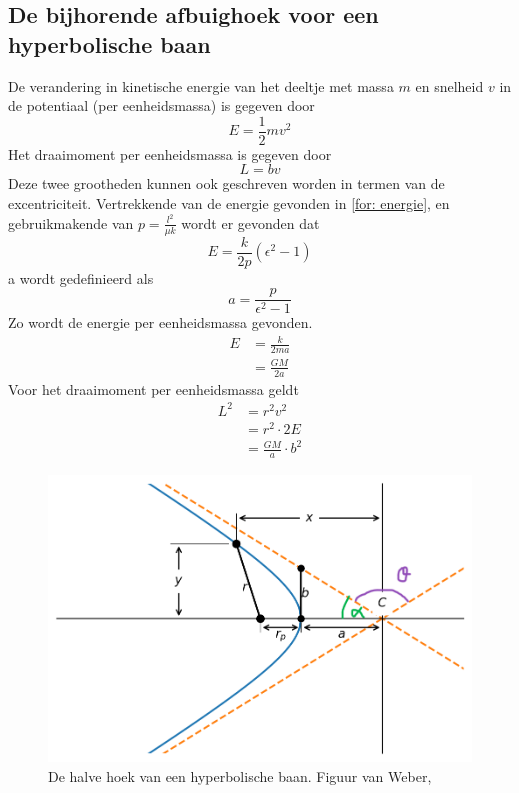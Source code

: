 \subsection{De bijhorende afbuighoek voor een hyperbolische baan}
De verandering in kinetische energie van het deeltje met massa $m$ en snelheid $v$ in de potentiaal (per eenheidsmassa) is gegeven door 
\begin{equation}
    E=\frac{1}{2}mv^{2}
    \label{for:energie}
\end{equation}
Het draaimoment per eenheidsmassa is gegeven door
\begin{equation}
    L=bv
    \label{for:draaimoment}
\end{equation}
Deze twee grootheden kunnen ook geschreven worden in termen van de excentriciteit. Vertrekkende van de energie gevonden in \cref{for: energie}, en gebruikmakende van $p=\frac{l^{2}}{\mu k}$ wordt er gevonden dat
$$E=\frac{k}{2p}(\epsilon^{2}-1)$$
a wordt gedefinieerd als 
$$a=\frac{p}{\epsilon^{2}-1}$$
Zo wordt de energie per eenheidsmassa gevonden.
\begin{align}
    E &= \frac{k}{2ma}\nonumber \\
    &= \frac{GM}{2a}
    \label{for:E}
\end{align}
Voor het draaimoment per eenheidsmassa geldt
\begin{align}
    L^{2} &= r^{2}v^{2}\nonumber \\
    &= r^{2}\cdot 2E \nonumber \\
    &= \frac{GM}{a}\cdot b^{2}
    \label{for:L2}
\end{align}
\begin{figure}
    \centering
    \includegraphics[width=0.95\linewidth]{Figures/hoek_hyperbool.png}
    \caption{De halve hoek van een hyperbolische baan. Figuur van Weber, \cite{weber-no-date}}
    \label{fig: halve hoek}
\end{figure}
